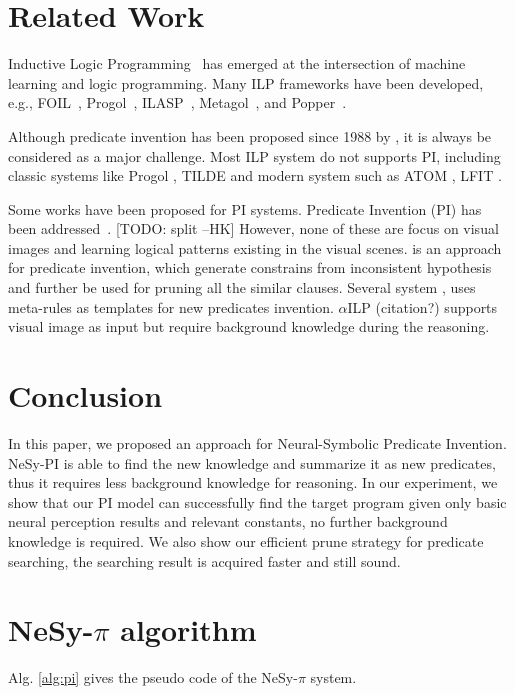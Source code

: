 \documentclass[
]{ceurart}
\newcommand{\hk}[1]{\textcolor{Apricot}{[#1 \textsc{--HK}]}}
\begin{document}
	
\section{Related Work}
Inductive Logic Programming~\cite{Muggleton91,Muggleton95,Nienhuys97,Cropper20} has emerged at the intersection of machine learning and logic programming. Many ILP frameworks have been developed, e.g., FOIL~\cite{Quinlan90}, Progol~\cite{Muggleton95}, ILASP~\cite{ILASP}, Metagol~\cite{metagol,Cropper2019LearningHL}, and Popper~\cite{popper}.

Although predicate invention has been proposed since 1988 by \cite{MUGGLETON1988339}, it is always be considered as a major challenge. Most ILP system do not supports PI, including classic systems like Progol \cite{Muggleton1995InverseEA}, TILDE\cite{BLOCKEEL1998285} and modern system such as ATOM \cite{atom}, LFIT \cite{LFIT}.

Some works have been proposed for PI systems. 
Predicate Invention (PI) has been addressed~\cite{Stahl93PI,aAthakravi12PI,Cropper2019LearningHL,Hocquette20ijcaiPI,Kok2007StatisticalPI,KramerAustrian2007PI,Cropper_Morel_Muggleton_2020aaaiPI,Cropper21PI}. \hk{TODO: split}
However, none of these are focus on visual images and learning logical patterns existing in the visual scenes. 
\cite{pilff} is an approach for predicate invention, which generate constrains from inconsistent hypothesis and further be used for pruning all the similar clauses.
Several system \cite{Evans2018}, \cite{kaminski_eiter_inoue_2018} uses meta-rules as templates for new predicates invention. 
$ \alpha $ILP (citation?) supports visual image as input but require background knowledge during the reasoning.

	
	\section{Conclusion}
	
	In this paper, we proposed an approach for Neural-Symbolic Predicate Invention. NeSy-PI is able to find the new knowledge and summarize it as new predicates, thus it requires less background knowledge for reasoning.
	In our experiment, we show that our PI model can successfully find the target program given only basic neural perception results and relevant constants, no further background knowledge is required. We also show our efficient prune strategy for predicate searching, the searching result is acquired faster and still sound.
	
	\newpage
	\appendix
	\section{NeSy-$\pi$ algorithm}
	Alg. \ref{alg:pi} gives the pseudo code of the NeSy-$\pi$ system. 
	
\end{document}
